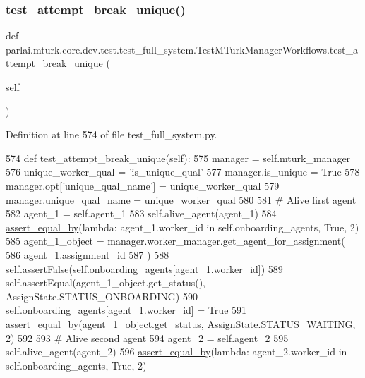 \subsubsection{\texorpdfstring{test\+\_\+attempt\+\_\+break\+\_\+unique()}{test\_attempt\_break\_unique()}}
{\footnotesize\ttfamily def parlai.\+mturk.\+core.\+dev.\+test.\+test\+\_\+full\+\_\+system.\+Test\+M\+Turk\+Manager\+Workflows.\+test\+\_\+attempt\+\_\+break\+\_\+unique (\begin{DoxyParamCaption}\item[{}]{self }\end{DoxyParamCaption})}



Definition at line 574 of file test\+\_\+full\+\_\+system.\+py.


\begin{DoxyCode}
574     \textcolor{keyword}{def }test\_attempt\_break\_unique(self):
575         manager = self.mturk\_manager
576         unique\_worker\_qual = \textcolor{stringliteral}{'is\_unique\_qual'}
577         manager.is\_unique = \textcolor{keyword}{True}
578         manager.opt[\textcolor{stringliteral}{'unique\_qual\_name'}] = unique\_worker\_qual
579         manager.unique\_qual\_name = unique\_worker\_qual
580 
581         \textcolor{comment}{# Alive first agent}
582         agent\_1 = self.agent\_1
583         self.alive\_agent(agent\_1)
584         \hyperlink{namespaceparlai_1_1mturk_1_1core_1_1test_1_1test__full__system_a0b463246d35658a2e422010f13dcf819}{assert\_equal\_by}(\textcolor{keyword}{lambda}: agent\_1.worker\_id \textcolor{keywordflow}{in} self.onboarding\_agents, \textcolor{keyword}{True}, 2)
585         agent\_1\_object = manager.worker\_manager.get\_agent\_for\_assignment(
586             agent\_1.assignment\_id
587         )
588         self.assertFalse(self.onboarding\_agents[agent\_1.worker\_id])
589         self.assertEqual(agent\_1\_object.get\_status(), AssignState.STATUS\_ONBOARDING)
590         self.onboarding\_agents[agent\_1.worker\_id] = \textcolor{keyword}{True}
591         \hyperlink{namespaceparlai_1_1mturk_1_1core_1_1test_1_1test__full__system_a0b463246d35658a2e422010f13dcf819}{assert\_equal\_by}(agent\_1\_object.get\_status, AssignState.STATUS\_WAITING, 2)
592 
593         \textcolor{comment}{# Alive second agent}
594         agent\_2 = self.agent\_2
595         self.alive\_agent(agent\_2)
596         \hyperlink{namespaceparlai_1_1mturk_1_1core_1_1test_1_1test__full__system_a0b463246d35658a2e422010f13dcf819}{assert\_equal\_by}(\textcolor{keyword}{lambda}: agent\_2.worker\_id \textcolor{keywordflow}{in} self.onboarding\_agents, \textcolor{keyword}{True}, 2)

\end{DoxyCode}
